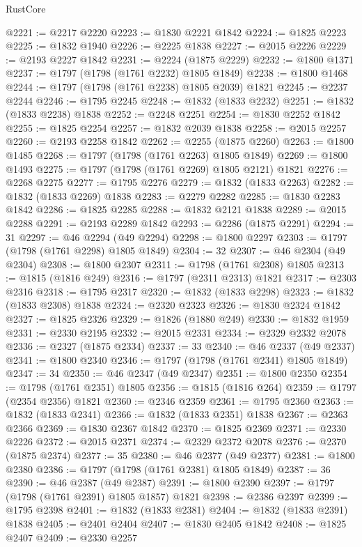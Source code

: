 \begin{lexlean}{RustCore}
\begin{coremodule}
@2221 := @2217 @2220
@2223 := @1830 @2221 @1842
@2224 := @1825 @2223
@2225 := @1832 @1940
@2226 := @2225 @1838
@2227 := @2015 @2226
@2229 := @2193 @2227 @1842
@2231 := @2224 (@1875 @2229)
@2232 := @1800 @1371
@2237 := @1797 (@1798 (@1761 @2232) @1805 @1849)
@2238 := @1800 @1468
@2244 := @1797 (@1798 (@1761 @2238) @1805 @2039) @1821
@2245 := @2237 @2244
@2246 := @1795 @2245
@2248 := @1832 (@1833 @2232)
@2251 := @1832 (@1833 @2238) @1838
@2252 := @2248 @2251
@2254 := @1830 @2252 @1842
@2255 := @1825 @2254
@2257 := @1832 @2039 @1838
@2258 := @2015 @2257
@2260 := @2193 @2258 @1842
@2262 := @2255 (@1875 @2260)
@2263 := @1800 @1485
@2268 := @1797 (@1798 (@1761 @2263) @1805 @1849)
@2269 := @1800 @1493
@2275 := @1797 (@1798 (@1761 @2269) @1805 @2121) @1821
@2276 := @2268 @2275
@2277 := @1795 @2276
@2279 := @1832 (@1833 @2263)
@2282 := @1832 (@1833 @2269) @1838
@2283 := @2279 @2282
@2285 := @1830 @2283 @1842
@2286 := @1825 @2285
@2288 := @1832 @2121 @1838
@2289 := @2015 @2288
@2291 := @2193 @2289 @1842
@2293 := @2286 (@1875 @2291)
@2294 := 31
@2297 := @46 @2294 (@49 @2294)
@2298 := @1800 @2297
@2303 := @1797 (@1798 (@1761 @2298) @1805 @1849)
@2304 := 32
@2307 := @46 @2304 (@49 @2304)
@2308 := @1800 @2307
@2311 := @1798 (@1761 @2308) @1805
@2313 := @1815 (@1816 @249)
@2316 := @1797 (@2311 @2313) @1821
@2317 := @2303 @2316
@2318 := @1795 @2317
@2320 := @1832 (@1833 @2298)
@2323 := @1832 (@1833 @2308) @1838
@2324 := @2320 @2323
@2326 := @1830 @2324 @1842
@2327 := @1825 @2326
@2329 := @1826 (@1880 @249)
@2330 := @1832 @1959
@2331 := @2330 @2195
@2332 := @2015 @2331
@2334 := @2329 @2332 @2078
@2336 := @2327 (@1875 @2334)
@2337 := 33
@2340 := @46 @2337 (@49 @2337)
@2341 := @1800 @2340
@2346 := @1797 (@1798 (@1761 @2341) @1805 @1849)
@2347 := 34
@2350 := @46 @2347 (@49 @2347)
@2351 := @1800 @2350
@2354 := @1798 (@1761 @2351) @1805
@2356 := @1815 (@1816 @264)
@2359 := @1797 (@2354 @2356) @1821
@2360 := @2346 @2359
@2361 := @1795 @2360
@2363 := @1832 (@1833 @2341)
@2366 := @1832 (@1833 @2351) @1838
@2367 := @2363 @2366
@2369 := @1830 @2367 @1842
@2370 := @1825 @2369
@2371 := @2330 @2226
@2372 := @2015 @2371
@2374 := @2329 @2372 @2078
@2376 := @2370 (@1875 @2374)
@2377 := 35
@2380 := @46 @2377 (@49 @2377)
@2381 := @1800 @2380
@2386 := @1797 (@1798 (@1761 @2381) @1805 @1849)
@2387 := 36
@2390 := @46 @2387 (@49 @2387)
@2391 := @1800 @2390
@2397 := @1797 (@1798 (@1761 @2391) @1805 @1857) @1821
@2398 := @2386 @2397
@2399 := @1795 @2398
@2401 := @1832 (@1833 @2381)
@2404 := @1832 (@1833 @2391) @1838
@2405 := @2401 @2404
@2407 := @1830 @2405 @1842
@2408 := @1825 @2407
@2409 := @2330 @2257

\end{coremodule}
\end{lexlean}
